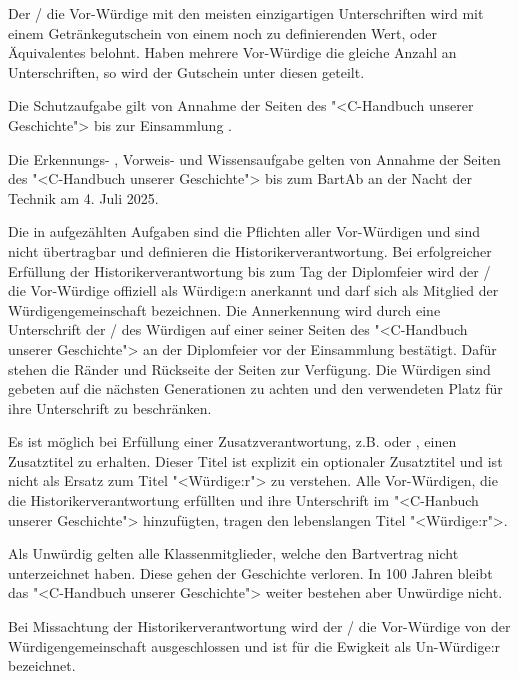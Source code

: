 \documentclass[fontsize=12pt,parskip=half]{scrartcl}
\begin{document}
\begin{contract}
  Der / die Vor-Würdige mit den meisten einzigartigen Unterschriften wird mit einem Getränkegutschein von einem noch zu definierenden Wert, oder Äquivalentes
  belohnt. Haben mehrere Vor-Würdige die gleiche Anzahl an Unterschriften, so wird der Gutschein unter diesen geteilt.

  \SubClause[title={Dauer}]
  Die Schutzaufgabe  gilt von Annahme der Seiten des "<C-Handbuch unserer Geschichte"> bis zur Einsammlung .

  Die Erkennungs- , Vorweis-  und Wissensaufgabe  gelten von Annahme der Seiten
  des "<C-Handbuch unserer Geschichte"> bis zum BartAb an der Nacht der Technik am 4. Juli 2025.

  \Clause[title={Historikerverantwortung}]\label{H.verantwortung}
  Die in  aufgezählten Aufgaben sind die Pflichten aller Vor-Würdigen und sind nicht übertragbar und definieren die Historikerverantwortung.
  Bei erfolgreicher Erfüllung der Historikerverantwortung bis zum Tag der Diplomfeier wird der / die Vor-Würdige offiziell als Würdige:n anerkannt und darf sich
  als Mitglied der Würdigengemeinschaft bezeichnen. Die Annerkennung wird durch eine Unterschrift der / des Würdigen auf einer seiner Seiten des "<C-Handbuch unserer Geschichte">
  an der Diplomfeier vor der Einsammlung  bestätigt. Dafür stehen die Ränder und Rückseite der Seiten zur Verfügung. Die Würdigen sind
  gebeten auf die nächsten Generationen zu achten und den verwendeten Platz für ihre Unterschrift zu beschränken.

  \SubClause[title={Zusatztitel}]
  Es ist möglich bei Erfüllung einer Zusatzverantwortung, z.B.  oder , einen Zusatztitel zu erhalten. Dieser Titel ist explizit ein optionaler
  Zusatztitel und ist nicht als Ersatz zum Titel "<Würdige:r"> zu verstehen. Alle Vor-Würdigen, die die Historikerverantwortung  erfüllten und ihre Unterschrift
  im "<C-Hanbuch unserer Geschichte"> hinzufügten, tragen den lebenslangen Titel "<Würdige:r">.

  \Clause[title={Unwürdige}]
  Als Unwürdig gelten alle Klassenmitglieder, welche den Bartvertrag nicht unterzeichnet haben. Diese gehen der Geschichte verloren. In 100 Jahren bleibt das
  "<C-Handbuch unserer Geschichte"> weiter bestehen aber Unwürdige nicht.

  Bei Missachtung der Historikerverantwortung  wird der / die Vor-Würdige von der Würdigengemeinschaft ausgeschlossen und ist für die Ewigkeit als
  Un-Würdige:r bezeichnet.


\end{contract}
\end{document}
